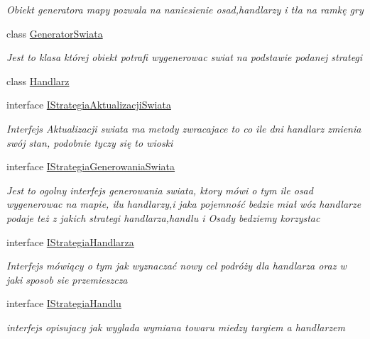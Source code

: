\begin{DoxyCompactItemize}
\begin{DoxyCompactList}\small\item\em Obiekt generatora mapy pozwala na naniesienie osad,handlarzy i tła na ramkę gry \end{DoxyCompactList}\item 
class \hyperlink{class_empire___simulator_1_1_generator_swiata}{Generator\+Swiata}
\begin{DoxyCompactList}\small\item\em Jest to klasa której obiekt potrafi wygenerowac swiat na podstawie podanej strategi \end{DoxyCompactList}\item 
class \hyperlink{class_empire___simulator_1_1_handlarz}{Handlarz}
\item 
interface \hyperlink{interface_empire___simulator_1_1_i_strategia_aktualizacji_swiata}{I\+Strategia\+Aktualizacji\+Swiata}
\begin{DoxyCompactList}\small\item\em Interfejs Aktualizacji swiata ma metody zwracajace to co ile dni handlarz zmienia swój stan, podobnie tyczy się to wioski \end{DoxyCompactList}\item 
interface \hyperlink{interface_empire___simulator_1_1_i_strategia_generowania_swiata}{I\+Strategia\+Generowania\+Swiata}
\begin{DoxyCompactList}\small\item\em Jest to ogolny interfejs generowania swiata, ktory mówi o tym ile osad wygenerowac na mapie, ilu handlarzy,i jaka pojemność bedzie miał wóz handlarze podaje też z jakich strategi handlarza,handlu i Osady bedziemy korzystac \end{DoxyCompactList}\item 
interface \hyperlink{interface_empire___simulator_1_1_i_strategia_handlarza}{I\+Strategia\+Handlarza}
\begin{DoxyCompactList}\small\item\em Interfejs mówiący o tym jak wyznaczać nowy cel podróży dla handlarza oraz w jaki sposob sie przemieszcza \end{DoxyCompactList}\item 
interface \hyperlink{interface_empire___simulator_1_1_i_strategia_handlu}{I\+Strategia\+Handlu}
\begin{DoxyCompactList}\small\item\em interfejs opisujacy jak wyglada wymiana towaru miedzy targiem a handlarzem \end{DoxyCompactList}\item 

\end{DoxyCompactItemize}
